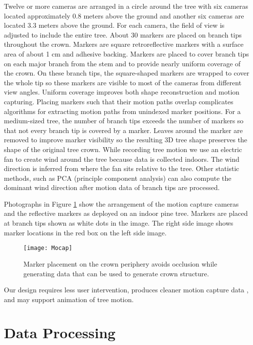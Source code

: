 Twelve or more cameras are arranged in a circle around the tree with six cameras located approximately 0.8 meters above the ground and another six cameras are located 3.3 meters above the ground. For each camera, the field of view is adjusted to include the entire tree. About 30 markers are placed on branch tips throughout the crown. Markers are square retroreflective markers with a surface area of about 1 cm and adhesive backing. Markers are placed to cover branch tips on each major branch from the stem and to provide nearly uniform coverage of the crown. On these branch tips, the square-shaped markers are wrapped to cover the whole tip so these markers are visible to most of the cameras from different view angles. Uniform coverage improves both shape reconstruction and motion capturing. Placing markers such that their motion paths overlap complicates algorithms for extracting motion paths from unindexed marker positions. For a medium-sized tree, the number of branch tips exceeds the number of markers so that not every branch tip is covered by a marker. Leaves around the marker are removed to improve marker visibility so the resulting 3D tree shape preserves the shape of the original tree crown. While recording tree motion we use an electric fan to create wind around the tree because data is collected indoors. The wind direction is inferred from where the fan sits relative to the tree. Other statistic methods, such as PCA (principle component analysis) can also compute the dominant wind direction after motion data of branch tips are processed.

Photographs in Figure \ref{fig:mocap} show the arrangement of the motion capture cameras and the reflective markers as deployed on an indoor pine tree. Markers are placed at branch tips shown as white dots in the image. The right side image shows marker locations in the red box on the left side image. 

\begin{figure}[!t]
\centering
\texttt{[image: Mocap]}
\caption[Marker placement on the crown periphery.]{Marker placement on the crown periphery avoids occlusion while generating data that can be used to generate crown structure.}
\label{fig:mocap}
\end{figure}

Our design requires less user intervention, produces cleaner motion capture data , and may support animation of tree motion.

\section{Data Processing}
\label{sec:Dataprocessing}

